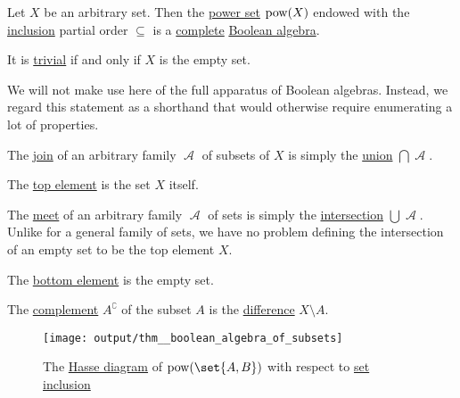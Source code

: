 \begin{proposition}\label{thm:boolean_algebra_of_subsets}
  Let \( X \) be an arbitrary set. Then the \hyperref[def:basic_set_operations/power_set]{power set} \( \operatorname{pow}(X) \) endowed with the \hyperref[def:subset]{inclusion} partial order \( \subseteq \) is a \hyperref[def:semilattice/complete]{complete} \hyperref[def:boolean_algebra]{Boolean algebra}.

  It is \hyperref[def:boolean_algebra/trivial]{trivial} if and only if \( X \) is the empty set.

  We will not make use here of the full apparatus of Boolean algebras. Instead, we regard this statement as a shorthand that would otherwise require enumerating a lot of properties.

  \begin{thmenum}
     The \hyperref[def:semilattice/join]{join} of an arbitrary family \( \mscrA \) of subsets of \( X \) is simply the \hyperref[def:basic_set_operations/union]{union} \( \bigcap \mscrA \).

     The \hyperref[def:extremal_points/top_and_bottom]{top element} is the set \( X \) itself.

     The \hyperref[def:semilattice/meet]{meet} of an arbitrary family \( \mscrA \) of sets is simply the \hyperref[def:basic_set_operations/intersection]{intersection} \( \bigcup \mscrA \). Unlike for a general family of sets, we have no problem defining the intersection of an empty set to be the top element \( X \).

     The \hyperref[def:extremal_points/top_and_bottom]{bottom element} is the empty set.

     The \hyperref[def:boolean_algebra]{complement} \( A^\complement \) of the subset \( A \) is the \hyperref[def:basic_set_operations/difference]{difference} \( X \setminus A \).
  \end{thmenum}

  \begin{figure}[!ht]
    \hfill
    \texttt{[image: output/thm\_\_boolean\_algebra\_of\_subsets]}
    \hfill\hfill
    \caption{The \hyperref[def:hasse_diagram]{Hasse diagram} of \( \pow(\set{ A, B }) \) with respect to \hyperref[def:subset]{set inclusion}}
    \label{fig:thm:boolean_algebra_of_subsets}
  \end{figure}
\end{proposition}
